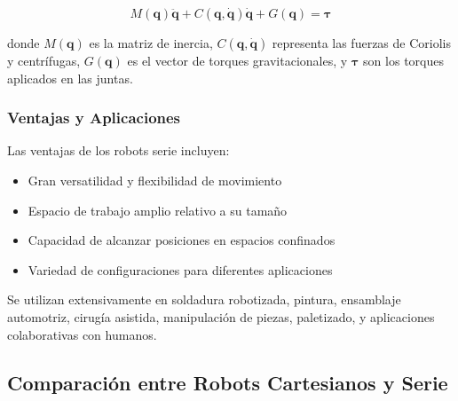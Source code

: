 \begin{equation}
M(\mathbf{q})\ddot{\mathbf{q}} + C(\mathbf{q}, \dot{\mathbf{q}})\dot{\mathbf{q}} + G(\mathbf{q}) = \boldsymbol{\tau}
\end{equation}

donde $M(\mathbf{q})$ es la matriz de inercia, $C(\mathbf{q}, \dot{\mathbf{q}})$ representa las fuerzas de Coriolis y centrífugas, $G(\mathbf{q})$ es el vector de torques gravitacionales, y $\boldsymbol{\tau}$ son los torques aplicados en las juntas.

\subsubsection{Ventajas y Aplicaciones}

Las ventajas de los robots serie incluyen:

\begin{itemize}
    \item Gran versatilidad y flexibilidad de movimiento
    \item Espacio de trabajo amplio relativo a su tamaño
    \item Capacidad de alcanzar posiciones en espacios confinados
    \item Variedad de configuraciones para diferentes aplicaciones
\end{itemize}

Se utilizan extensivamente en soldadura robotizada, pintura, ensamblaje automotriz, cirugía asistida, manipulación de piezas, paletizado, y aplicaciones colaborativas con humanos.

\subsection{Comparación entre Robots Cartesianos y Serie}

